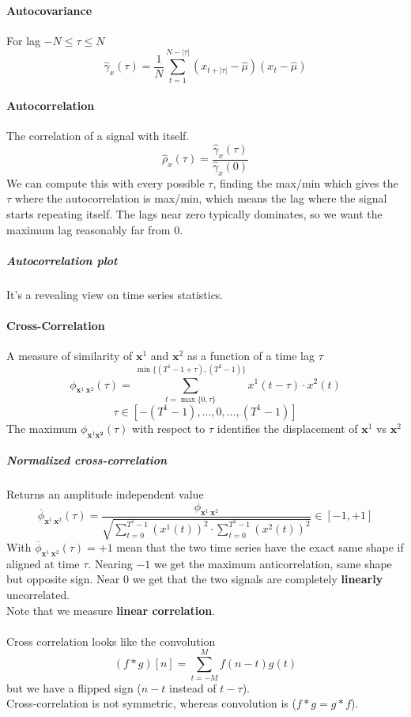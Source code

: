 \documentclass[10pt]{report}
\begin{document}
\paragraph{Autocovariance} For lag $-N\leq \tau \leq N$
$$\hat\gamma_x(\tau) = \frac{1}{N}\sum_{t=1}^{N-|\tau|} (x_{t+|\tau|}-\hat\mu)(x_t - \hat\mu)$$
\paragraph{Autocorrelation} The correlation of a signal with itself. $$\hat\rho_x(\tau)=\frac{\hat\gamma_x(\tau)}{\hat\gamma_x(0)}$$
We can compute this with every possible $\tau$, finding the max/min which gives the $\tau$ where the autocorrelation is max/min, which means the lag where the signal starts repeating itself. The lags near zero typically dominates, so we want the maximum lag reasonably far from 0.
\subparagraph{Autocorrelation plot} It's a revealing view on time series statistics.
\paragraph{Cross-Correlation} A measure of similarity of $\mathbf{x}^1$ and $\mathbf{x}^2$ as a function of a time lag $\tau$ $$\phi_{\mathbf{x}^1\:\mathbf{x}^2}(\tau)=\sum_{t = \max\{0,\tau\}}^{\min\{(T^1 - 1 + \tau), (T^2 - 1)\}} x^1(t-\tau)\cdot x^2(t)$$
$$\tau\in[-(T^1-1),\ldots,0,\ldots,(T^1-1)]$$
The maximum $\phi_{\mathbf{x}^1\mathbf{x^2}}(\tau)$ with respect to $\tau$ identifies the displacement of $\mathbf{x}^1$ vs $\mathbf{x}^2$
\subparagraph{Normalized cross-correlation} Returns an amplitude independent value
$$\overline{\phi}_{\mathbf{x}^1\:\mathbf{x}^2}(\tau) = \frac{\phi_{\mathbf{x}^1\:\mathbf{x}^2}}{\sqrt{\sum_{t=0}^{T^1-1}(x^1(t))^2\cdot\sum_{t=0}^{T^2-1}(x^2(t))^2}} \in [-1,+1]$$
With $\overline{\phi}_{\mathbf{x}^1\:\mathbf{x}^2}(\tau) = +1$ mean that the two time series have the exact same shape if aligned at time $\tau$. Nearing $-1$ we get the maximum anticorrelation, same shape but opposite sign. Near 0 we get that the two signals are completely \textbf{linearly} uncorrelated.\\
Note that we measure \textbf{linear correlation}.\\\\
Cross correlation looks like the convolution $$(f * g)[n]=\sum_{t=-M}^M f(n-t)g(t)$$ but we have a flipped sign ($n-t$ instead of $t-\tau$).\\
Cross-correlation is not symmetric, whereas convolution is ($f * g = g * f$).
\end{document}
